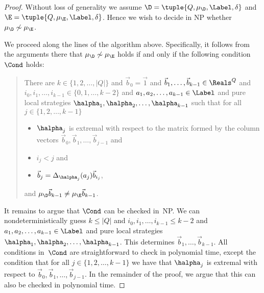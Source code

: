 \begin{proof}
Without loss of generality we assume
$\D = \tuple{Q,\mu_{\D},\Label,\delta}$ and
$\E = \tuple{Q,\mu_{\E},\Label,\delta}$.
Hence we wish to decide in {\sf NP} whether $\mu_{\D} \not\sim \mu_{\E}$.

We proceed along the lines of the algorithm above.
Specifically, it follows from the arguments there that $\mu_\D \not\sim \mu_\E$ holds if and only if the following condition~$\Cond$ holds:
\begin{quote}
There are $k \in \{1, 2, \ldots, |Q|\}$ and $\vec{b}_0 = \vec{1}$ and $\vec{b}_1, \ldots, \vec{b}_{k-1} \in \Reals^Q$
and $i_0, i_1, \ldots, i_{k-1} \in \{0, 1, \ldots, k-2\}$
and $a_1, a_2, \ldots, a_{k-1} \in \Label$ and pure local strategies $\halpha_1, \halpha_2, \ldots, \halpha_{k-1}$ such that for all $j \in \{1, 2, \ldots, k-1\}$
\begin{itemize}
\item $\halpha_j$ is extremal with respect to the matrix formed by the column vectors $\vec{b}_0, \vec{b}_1, \ldots, \vec{b}_{j-1}$ and
\item $i_j < j$ and
\item $\vec{b}_j = \Delta_{\halpha_j}(a_j) \vec{b}_{i_j}$,
\end{itemize}
and $\mu_{\D} \vec{b}_{k-1} \ne \mu_{\E} \vec{b}_{k-1}$.
\end{quote}
It remains to argue that $\Cond$ can be checked in~{\sf NP}.
We can nondeterministically guess $k \le |Q|$ and $i_0, i_1, \ldots, i_{k-1} \le k-2$ and $a_1, a_2, \ldots, a_{k-1} \in \Label$ and pure local strategies $\halpha_1, \halpha_2, \ldots, \halpha_{k-1}$.
This determines $\vec{b}_1, \ldots, \vec{b}_{k-1}$.
All conditions in~$\Cond$ are straightforward to check in polynomial time, except the condition that for all $j \in \{1, 2, \ldots, k-1\}$ we have that $\halpha_j$ is extremal with respect to $\vec{b}_0, \vec{b}_1, \ldots, \vec{b}_{j-1}$.
In the remainder of the proof, we argue that this can also be checked in polynomial time.


\end{proof}

